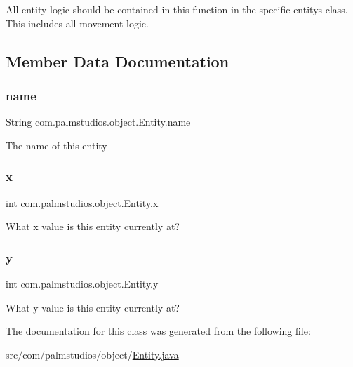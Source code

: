 All entity logic should be contained in this function in the specific entity\textquotesingle{}s class. This includes all movement logic. 

\subsection{Member Data Documentation}
\mbox{\label{classcom_1_1palmstudios_1_1object_1_1_entity_ad1dd4b4b3fd94cdd50041ed527a15f06}} 
\subsubsection{\texorpdfstring{name}{name}}
{\footnotesize\ttfamily String com.\+palmstudios.\+object.\+Entity.\+name\hspace{0.3cm}{\ttfamily [protected]}}

The name of this entity \mbox{\label{classcom_1_1palmstudios_1_1object_1_1_entity_a6afb5022e6335acc944d420251f111fc}} 
\subsubsection{\texorpdfstring{x}{x}}
{\footnotesize\ttfamily int com.\+palmstudios.\+object.\+Entity.\+x\hspace{0.3cm}{\ttfamily [protected]}}

What x value is this entity currently at? \mbox{\label{classcom_1_1palmstudios_1_1object_1_1_entity_a6bcadd557e5642f4ce95f220f3f7c4c7}} 
\subsubsection{\texorpdfstring{y}{y}}
{\footnotesize\ttfamily int com.\+palmstudios.\+object.\+Entity.\+y\hspace{0.3cm}{\ttfamily [protected]}}

What y value is this entity currently at? 

The documentation for this class was generated from the following file\+:\begin{DoxyCompactItemize}
\item 
src/com/palmstudios/object/\hyperlink{_entity_8java}{Entity.\+java}\end{DoxyCompactItemize}

